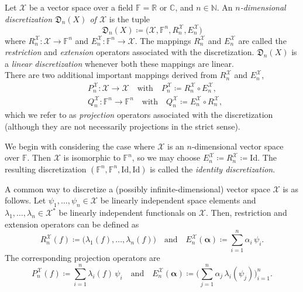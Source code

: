 \documentclass[a4paper]{paper}
\newcommand*{\SPC}[1]{{\ensuremath{\mathscr{#1}}}}
\newcommand*{\SPCX}{\SPC{X}}
\newcommand*{\FIELD}{{\ensuremath{\mathbb{F}}}}
\newcommand*{\Fn}{{\ensuremath{\FIELD^n}}}
\newcommand{\RR}{{\ensuremath{\mathbb{R}}}}
\newcommand{\CC}{{\ensuremath{\mathbb{C}}}}
\newcommand{\NN}{{\ensuremath{\mathbb{N}}}}
\newcommand*{\OP}[1]{{\ensuremath{\mathcal{#1}}}}
\newcommand*{\OPID}{\OP{\mathrm{Id}}}
\newcommand*{\EXT}[2]{\ensuremath{E_{#1}^{#2}}}
\newcommand*{\REST}[2]{\ensuremath{R_{#1}^{#2}}}
\newcommand*{\PROJ}[2]{\ensuremath{P_{#1}^{#2}}}
\newcommand*{\COPROJ}[2]{\ensuremath{Q_{#1}^{#2}}}
\newcommand*{\RnX}{{\ensuremath{\REST{n}{\SPC{X}}}}}
\newcommand*{\EnX}{{\ensuremath{\EXT{n}{\SPC{X}}}}}
\newcommand*{\PnX}{{\ensuremath{\PROJ{n}{\SPCX}}}}
\newcommand*{\QnX}{{\ensuremath{\COPROJ{n}{\SPCX}}}}
\newcommand*{\DISCR}[2]{{\ensuremath{\mathfrak{D}_{#1}(#2)}}}
\newcommand*{\DISCRnX}{\DISCR{n}{X}}
\DeclareMathOperator{\DEFEQ}{{\coloneqq}}
\newcommand*{\BDalpha}{\boldsymbol{\alpha}}
\begin{document}
\begin{definition}
 \label{def:discr:space:space_discr}
 Let $\SPCX$ be a vector space over a field $\FIELD = \RR \text{ or } \CC$, and $n \in \NN$.
 An \emph{$n$-dimensional discretization $\DISCRnX$ of $\SPCX$} is the tuple
 \begin{equation*}
  \DISCRnX \DEFEQ  \bigl( \SPCX, \Fn, \RnX, \EnX \bigr) 
 \end{equation*}
 where $\RnX \colon \SPCX \to \Fn$ and $\EnX \colon \Fn \to \SPCX$. The mappings $\RnX$ and $\EnX$ 
 are called the \emph{restriction} and \emph{extension} operators associated with the discretization. 
 $\DISCRnX$ is a \emph{linear discretization} whenever both these mappings are linear.\\
 There are two additional important mappings derived from $\RnX$ and $\EnX$,
 \begin{align*}
  & \PnX \colon \SPCX \to \SPCX \quad \text{with} \quad \PnX \DEFEQ  \RnX \circ \EnX, \\
  & \QnX \colon \Fn \to \Fn \quad \text{with} \quad \QnX \DEFEQ  \EnX \circ \RnX,
 \end{align*}
 which we refer to as \emph{projection} operators associated with the discretization (although they are not 
necessarily  projections in the strict sense).
\end{definition}


\begin{examp}
 We begin with considering the case where $\SPCX$ is an $n$-dimensional vector space over $\FIELD$. Then $\SPCX$ is 
 isomorphic to $\Fn$, so we may choose $\EnX \DEFEQ \RnX\DEFEQ \OPID$. The resulting discretization 
 $( \Fn, \Fn, \OPID, \OPID )$ is called 
 the \emph{identity discretization}. 
\end{examp}


\begin{examp}
 A common way to discretize a (possibly infinite-dimensional) vector space $\SPCX$ is as follows. Let 
 $\psi_1, \dots, \psi_n \in \SPCX$ be linearly independent space elements and 
 $\lambda_1, \dots, \lambda_n \in \SPCX^*$ be linearly independent functionals on $\SPCX$. Then, restriction and 
 extension operators can be defined as
 \begin{equation*}
  \RnX(f) \DEFEQ  \big( \lambda_1(f), \dots, \lambda_n(f) \big) 
  \quad \text{and} \quad
  \EnX(\BDalpha) \DEFEQ  \sum_{i=1}^n \alpha_i\, \psi_i.
 \end{equation*}
 The corresponding projection operators are
 \begin{equation*}
  \PnX(f) \DEFEQ  \sum_{i=1}^n \lambda_i(f)\, \psi_i
  \quad \text{and} \quad
  \EnX(\BDalpha) \DEFEQ  \bigg( \sum_{j=1}^n \alpha_j\, \lambda_i(\psi_j) \bigg)_{i=1}^n.
 \end{equation*}

\end{examp}
\end{document}
